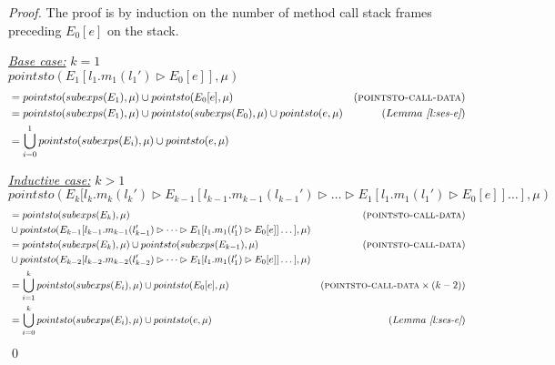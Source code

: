 \documentclass{llncs}
\begin{document}
\begin{proof} The proof is by induction on the number of method call stack frames preceding $E_0[e]$ on the stack.

\noindent\underline{\textit{Base case:}} $k = 1$\\
\noindent$pointsto(E_1[l_1.m_1(l_1') \rhd E_0[e]], \mu)$
\vspace{-7pt}
\begin{align*}
&= pointsto(subexps(E_1), \mu) \cup pointsto(E_0[e], \mu) & (\textsc{pointsto-call-data}) \\
&= pointsto(subexps(E_1), \mu) \cup pointsto(subexps(E_0), \mu) \cup pointsto(e, \mu) & (Lemma~\textit{\ref{l:ses-e}}) \\
&= \bigcup^1_{i = 0} pointsto(subexps(E_i), \mu) \cup pointsto(e, \mu)
\end{align*}

\noindent\underline{\textit{Inductive case:}} $k > 1$\\
\noindent$pointsto(E_k[l_k.m_k(l_k') \rhd E_{k-1}[l_{k-1}.m_{k-1}(l_{k-1}') \rhd \dots \rhd E_1[l_1.m_1(l_1') \rhd E_0[e]] \dots ], \mu)$
\vspace{-7pt}
\begin{align*}
&= pointsto(subexps(E_k), \mu) & (\textsc{pointsto-call-data}) \\
& \cup pointsto(E_{k-1}[l_{k-1}.m_{k-1}(l_{k-1}') \rhd \dots \rhd E_1[l_1.m_1(l_1') \rhd E_0[e]] \dots ], \mu)\\
&= pointsto(subexps(E_k), \mu) \cup pointsto(subexps(E_{k-1}), \mu)& (\textsc{pointsto-call-data}) \\
& \cup pointsto(E_{k-2}[l_{k-2}.m_{k-2}(l_{k-2}') \rhd \dots \rhd E_1[l_1.m_1(l_1') \rhd E_0[e]] \dots ], \mu)\\
&= \bigcup^k_{i = 1} pointsto(subexps(E_i), \mu) \cup pointsto(E_0[e], \mu) & (\textsc{pointsto-call-data} \times (k - 2)) \\
&= \bigcup^k_{i = 0} pointsto(subexps(E_i), \mu) \cup pointsto(e, \mu) & (Lemma~\textit{\ref{l:ses-e}})
\end{align*}
\qed
\end{proof}
\end{document}

